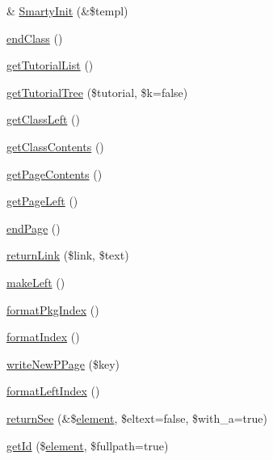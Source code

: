 \begin{DoxyCompactItemize}
\& \hyperlink{class_h_t_m_l_smarty_converter_a7ed01c3315cd29f50a08d695548da9ae}{\-Smarty\-Init} (\&\$templ)
\item 
\hyperlink{class_h_t_m_l_smarty_converter_ae4962a5674fd1be0f3795cb72f2974bf}{end\-Class} ()
\item 
\hyperlink{class_h_t_m_l_smarty_converter_a0a81446debe61aff655d6904fc312244}{get\-Tutorial\-List} ()
\item 
\hyperlink{class_h_t_m_l_smarty_converter_ad57d358bc8174edac88585e8a51d9010}{get\-Tutorial\-Tree} (\$tutorial, \$k=false)
\item 
\hyperlink{class_h_t_m_l_smarty_converter_a1eccf48239e75ebd1c0fca6657efab89}{get\-Class\-Left} ()
\item 
\hyperlink{class_h_t_m_l_smarty_converter_ab8254b0b0dd1a41d58efebb05facd486}{get\-Class\-Contents} ()
\item 
\hyperlink{class_h_t_m_l_smarty_converter_aaaa3d5f5272a4d2aa3f976d0544d112a}{get\-Page\-Contents} ()
\item 
\hyperlink{class_h_t_m_l_smarty_converter_afa8d069aa574385fb7058516cc6d92cd}{get\-Page\-Left} ()
\item 
\hyperlink{class_h_t_m_l_smarty_converter_a7e7c9e2e7d88f78fa6f8bf8776c443e5}{end\-Page} ()
\item 
\hyperlink{class_h_t_m_l_smarty_converter_af40fcd39ab514ae82e555a451dd72dc2}{return\-Link} (\$link, \$text)
\item 
\hyperlink{class_h_t_m_l_smarty_converter_aad3f0d3857e7995a1ede44d9b901e2d4}{make\-Left} ()
\item 
\hyperlink{class_h_t_m_l_smarty_converter_a37200c9f589ee4eaeed637c5ce1af356}{format\-Pkg\-Index} ()
\item 
\hyperlink{class_h_t_m_l_smarty_converter_a963f73984fad30cb1776cd293eeb7db7}{format\-Index} ()
\item 
\hyperlink{class_h_t_m_l_smarty_converter_a6b7e21b9959092d614a9c07a447c2643}{write\-New\-P\-Page} (\$key)
\item 
\hyperlink{class_h_t_m_l_smarty_converter_a39bb30299ec5d6ba31096e51f2bcc4b4}{format\-Left\-Index} ()
\item 
\hyperlink{class_h_t_m_l_smarty_converter_a016c461f5a37e15d2a431c7083c904a3}{return\-See} (\&\$\hyperlink{bug-904820_8php_aa94081298ab2dfd0f261cce6c203d9aa}{element}, \$eltext=false, \$with\-\_\-a=true)
\item 
\hyperlink{class_h_t_m_l_smarty_converter_a5308a5a2e0656a3300684dde375b2e41}{get\-Id} (\$\hyperlink{bug-904820_8php_aa94081298ab2dfd0f261cce6c203d9aa}{element}, \$fullpath=true)

\end{DoxyCompactItemize}
